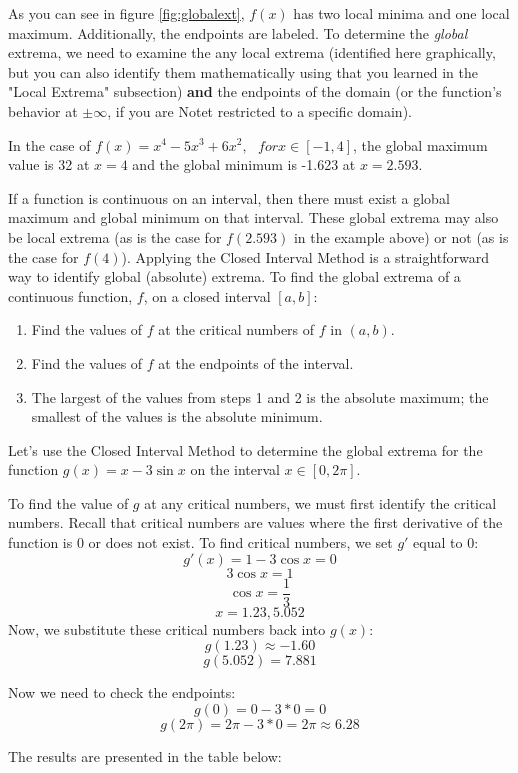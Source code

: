 As you can see in figure \ref{fig:globalext}, $f(x)$ has two local minima and 
one local maximum. Additionally, the endpoints are labeled. To determine the 
\textit{global} extrema, we need to examine the any local extrema (identified 
here graphically, but you can also identify them mathematically using that you 
learned in the "Local Extrema" subsection) \textbf{and} the endpoints of the domain (or 
the function's behavior at $\pm \infty$, if you are Notet restricted to a specific 
domain). 

In the case of $f(x) = x^4-5x^3+6x^2,\text{ }for x\in [-1,4]$, the global 
maximum value is 32 at $x=4$ and the global minimum is -1.623 at $x=2.593$. 

If a function is continuous on an interval, then there must exist a global 
maximum and global minimum on that interval. These global extrema may also be 
local extrema (as is the case for $f(2.593)$ in the example above) or not (as 
is the case for $f(4)$). Applying the Closed Interval Method is a 
straightforward way to identify global (absolute) extrema. To find the global 
extrema of a continuous function, $f$, on a closed interval $[a, b]$:
\begin{enumerate}
	\item Find the values of $f$ at the critical numbers of $f$ in $(a, b)$.
	\item Find the values of $f$ at the endpoints of the interval.
	\item The largest of the values from steps 1 and 2 is the absolute maximum; 
	the smallest of the values is the absolute minimum.
\end{enumerate}

Let's use the Closed Interval Method to determine the global extrema for the 
function $g(x) = x-3\sin{x}$ on the interval $x \in [0, 2\pi]$.

To find the value of $g$ at any critical numbers, we must first identify the 
critical numbers. Recall that critical numbers are values where the first 
derivative of the function is $0$ or does not exist. To find critical numbers, 
we set $g'$ equal to $0$:
$$g'(x) = 1-3\cos{x}=0$$
$$3\cos{x} = 1$$
$$\cos{x} = \frac{1}{3}$$
$$x=1.23, 5.052$$
Now, we substitute these critical numbers back into $g(x)$:
$$g(1.23) \approx -1.60$$
$$g(5.052) = 7.881$$

Now we need to check the endpoints:
$$g(0) = 0-3*0 = 0$$
$$g(2\pi) = 2\pi - 3*0 = 2\pi \approx 6.28$$

The results are presented in the table below:

